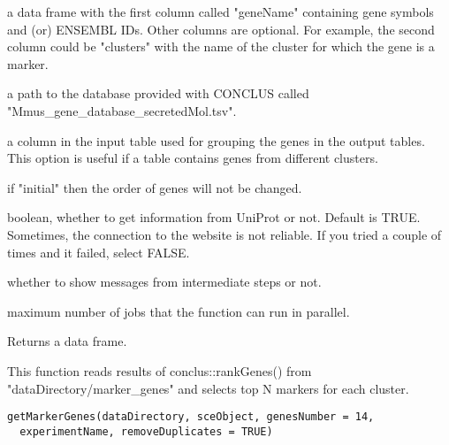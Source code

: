 \documentclass[a4paper]{book}
\begin{document}
\begin{Arguments}
\begin{ldescription}
\item[\code{genes}] a data frame with the first column called "geneName" containing gene symbols and (or) ENSEMBL IDs.
Other columns are optional. For example, the second column could be "clusters" with the name of the cluster 
for which the gene is a marker.

\item[\code{databaseDir}] a path to the database provided with CONCLUS called "Mmus\_gene\_database\_secretedMol.tsv".

\item[\code{groupBy}] a column in the input table used for grouping the genes in the output tables.
This option is useful if a table contains genes from different clusters.

\item[\code{orderGenes}] if "initial" then the order of genes will not be changed.

\item[\code{getUniprot}] boolean, whether to get information from UniProt or not. Default is TRUE.
Sometimes, the connection to the website is not reliable. 
If you tried a couple of times and it failed, select FALSE.

\item[\code{silent}] whether to show messages from intermediate steps or not.

\item[\code{coresGenes}] maximum number of jobs that the function can run in parallel.
\end{ldescription}
\end{Arguments}
%
\begin{Value}
Returns a data frame.
\end{Value}
%
\begin{Description}\relax
This function reads results of conclus::rankGenes() from "dataDirectory/marker\_genes" and selects top N markers for each cluster.
\end{Description}
%
\begin{Usage}
\begin{verbatim}
getMarkerGenes(dataDirectory, sceObject, genesNumber = 14,
  experimentName, removeDuplicates = TRUE)
\end{verbatim}
\end{Usage}
%
\end{document}
